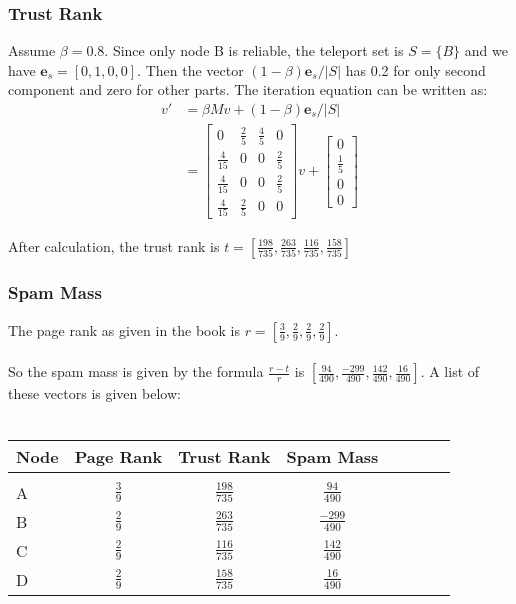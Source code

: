 \documentclass[paper=a4, fontsize=15pt]{article} %
\begin{document}
\subsubsection*{Trust Rank}
Assume $\beta = 0.8$. 
Since only node B is reliable, the teleport set is $S = \{B\}$ and we have $\boldsymbol{e}_s = [0,1,0,0]$. 
Then the vector $(1-\beta)\boldsymbol{e}_s/|S|$ has 0.2 for only second component and zero for other parts.
The iteration equation can be written as:\\
\begin{align}
v' 
&= \beta M v + (1-\beta)\boldsymbol{e}_s/|S|  \\
&= 
\begin{bmatrix}
       0 			 & \frac{2}{5} & \frac{4}{5}  	& 0          \\[0.3em]
       \frac{4}{15}  & 0           & 0 				& \frac{2}{5}					\\[0.3em]
       \frac{4}{15}  & 0		   & 0 				& \frac{2}{5}					\\[0.3em]
       \frac{4}{15}  & \frac{2}{5} & 0				& 0
\end{bmatrix}v 
+ 
\begin{bmatrix}
       0 			 \\[0.3em]
       \frac{1}{5}  \\[0.3em]
	   0  \\[0.3em]
       0
\end{bmatrix}
\end{align}

After calculation, 
the trust rank is $t =[\frac{198}{735},\frac{263}{735},\frac{116}{735},\frac{158}{735}  ]$
\subsubsection*{Spam Mass}
The page rank as given in the book is $r = [\frac{3}{9},\frac{2}{9},\frac{2}{9},\frac{2}{9}]$.\\
\\
So the spam mass is given by the formula $\frac{r-t}{r}$ is 
$[\frac{94}{490},\frac{-299}{490},\frac{142}{490},\frac{16}{490}]$.
A list of these vectors is given below:\\
\\
\begin{tabular}{l*{6}{c}r}
Node             & Page Rank & Trust Rank & Spam Mass  \\
\hline\\
A		            & $\frac{3}{9}$ & $\frac{198}{735}$ & $\frac{94}{490}$   \\[1em]
B		           	& $\frac{2}{9}$ & $\frac{263}{735}$ & $\frac{-299}{490}$  \\[1em]
C				    & $\frac{2}{9}$ & $\frac{116}{735}$ & $\frac{142}{490}$ \\[1em]
D				    & $\frac{2}{9}$ & $\frac{158}{735}$ & $\frac{16}{490}$ \\

\end{tabular}
\end{document}
